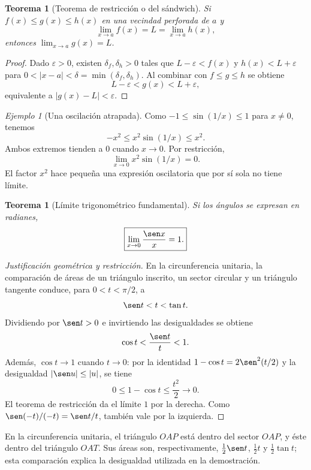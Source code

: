 \documentclass[12pt]{article}
\newtheorem{teorema}[definicion]{Teorema}
\theoremstyle{remark}
\newtheorem{ejemplo}{Ejemplo}
\begin{document}
\begin{teorema}[Teorema de restricción o del sándwich]
Si $f(x)\le g(x)\le h(x)$ en una vecindad perforada de $a$ y
\[
 \lim_{x\to a}f(x)=L=\lim_{x\to a}h(x),
\]
entonces $\lim_{x\to a}g(x)=L$.
\end{teorema}
\begin{proof}
Dado $\varepsilon>0$, existen $\delta_f,\delta_h>0$ tales que $L-\varepsilon<f(x)$ y $h(x)<L+\varepsilon$ para $0<|x-a|<\delta=\min(\delta_f,\delta_h)$. Al combinar con $f\le g\le h$ se obtiene
\[
 L-\varepsilon<g(x)<L+\varepsilon,
\]
equivalente a $|g(x)-L|<\varepsilon$.
\end{proof}

\begin{ejemplo}[Una oscilación atrapada]
Como $-1\le\sin(1/x)\le1$ para $x\ne0$, tenemos
\[
 -x^2\le x^2\sin(1/x)\le x^2.
\]
Ambos extremos tienden a $0$ cuando $x\to0$. Por restricción,
\[
 \boxed{\lim_{x\to0}x^2\sin(1/x)=0.}
\]
El factor $x^2$ hace pequeña una expresión oscilatoria que por sí sola no tiene límite.
\end{ejemplo}

\begin{teorema}[Límite trigonométrico fundamental]
Si los ángulos se expresan en radianes,
\[
 \boxed{\lim_{x\to0}\frac{\sen x}{x}=1.}
\]
\end{teorema}
\begin{proof}[Justificación geométrica y restricción]
En la circunferencia unitaria, la comparación de áreas de un triángulo inscrito, un sector circular y un triángulo tangente conduce, para $0<t<\pi/2$, a
\[
 \sen t<t<\tan t.
\]
Dividiendo por $\sen t>0$ e invirtiendo las desigualdades se obtiene
\[
 \cos t<\frac{\sen t}{t}<1.
\]
Además, $\cos t\to1$ cuando $t\to0$: por la identidad $1-\cos t=2\sen^2(t/2)$ y la desigualdad $|\sen u|\le|u|$, se tiene
\[
 0\le1-\cos t\le\frac{t^2}{2}\to0.
\]
El teorema de restricción da el límite $1$ por la derecha. Como $\sen(-t)/(-t)=\sen t/t$, también vale por la izquierda.
\end{proof}

\begin{center}
\end{center}
En la circunferencia unitaria, el triángulo $OAP$ está dentro del sector $OAP$, y éste dentro del triángulo $OAT$. Sus áreas son, respectivamente, $\frac12\sen t$, $\frac12t$ y $\frac12\tan t$; esta comparación explica la desigualdad utilizada en la demostración.
\end{document}
